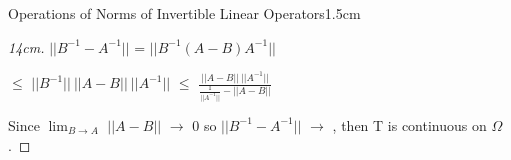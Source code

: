 \begin{ltheorem}{Operations of Norms of Invertible Linear Operators}{1.5cm}
\begin{proof}[14cm]
                \hspace{0.5cm}
                $||B^{-1} - A^{-1}||$
                = $||B^{-1}(A - B)A^{-1}||$

                \hspace{3.1cm}
                $\leq$ $||B^{-1}|| \ ||A - B|| \ ||A^{-1}||$
                $\leq$ $\frac{||A - B|| \ ||A^{-1}||}
                            {\frac{1}{||A^{-1}||} - ||A-B||}$

                Since $\lim_{B \rightarrow A}$ $||A-B||$ $\rightarrow$ 0
                so $||B^{-1} - A^{-1}||$ $\rightarrow$ , then
                T is continuous on $\Omega$.
            \end{proof}
    \end{ltheorem}

    \newpage



